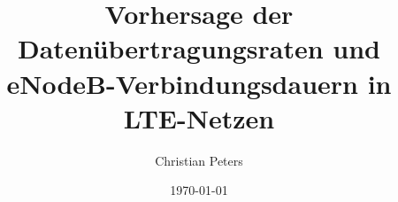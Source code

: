 \documentclass[a4paper,12pt,bibliography=totoc]{scrartcl}
\title{Vorhersage der Daten\"ubertragungsraten und eNodeB-Verbindungsdauern in LTE-Netzen}
\author{Christian Peters}
\date{\today}
\begin{document}


\newpage
\tableofcontents
\thispagestyle{empty}

\newpage

\setcounter{page}{1}











\newpage

\nocite{XGBoost, IEEE}


\end{document}
